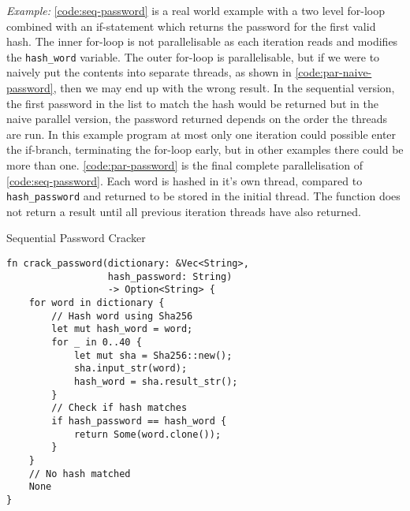 \documentclass[conference]{IEEEtran}
\begin{document}
\textit{Example:}
\autoref{code:seq-password} is a real world example with a two level for-loop combined with an if-statement which returns the password for the first valid hash. The inner for-loop is not parallelisable as each iteration reads and modifies the \texttt{hash\_word} variable. The outer for-loop is parallelisable, but if we were to naively put the contents into separate threads, as shown in \autoref{code:par-naive-password}, then we may end up with the wrong result. In the sequential version, the first password in the list to match the hash would be returned but in the naive parallel version, the password returned depends on the order the threads are run. In this example program at most only one iteration could possible enter the if-branch, terminating the for-loop early, but in other examples there could be more than one.
\autoref{code:par-password} is the final complete parallelisation of \autoref{code:seq-password}. Each word is hashed in it's own thread, compared to \texttt{hash\_password} and returned to be stored in the initial thread. The function does not return a result until all previous iteration threads have also returned.

\begin{algorithm}
\caption{Sequential Password Cracker}
\label{code:seq-password}
\begin{verbatim}
fn crack_password(dictionary: &Vec<String>,
                  hash_password: String)
                  -> Option<String> {
    for word in dictionary {
        // Hash word using Sha256
        let mut hash_word = word;
        for _ in 0..40 {
            let mut sha = Sha256::new();
            sha.input_str(word);
            hash_word = sha.result_str();
        }
        // Check if hash matches
        if hash_password == hash_word {
            return Some(word.clone());
        }
    }
    // No hash matched
    None
}
\end{verbatim}
\end{algorithm}
\end{document}
